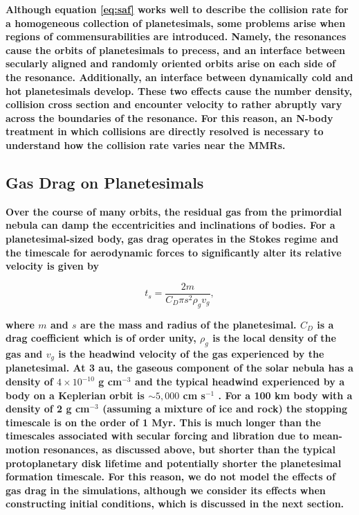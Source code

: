 \documentclass[fleqn,usenatbib]{mnras}
\begin{document}
\textbf{Although equation \ref{eq:saf} works well to describe the collision rate for a homogeneous collection of planetesimals, some problems arise when regions of commensurabilities are 
introduced. Namely, the resonances cause the orbits of planetesimals to precess, and an interface between secularly aligned and randomly oriented orbits arise on each side of the 
resonance. Additionally, an interface between dynamically cold and hot planetesimals develop. These two effects cause the number density, collision cross section and encounter velocity 
to rather abruptly vary across the boundaries of the resonance. For this reason, an N-body treatment in which collisions are directly resolved is necessary to understand how the collision 
rate varies near the MMRs.}

\subsection{Gas Drag on Planetesimals}\label{sec:pl_drag}

\textbf{Over the course of many orbits, the residual gas from the primordial nebula can damp the eccentricities and inclinations of bodies. For a planetesimal-sized body, gas drag operates 
in the Stokes regime and the timescale for aerodynamic forces to significantly alter its relative velocity is given by \citep{1976PThPh..56.1756A}}

\begin{equation}\label{eq:ts_stokes}
    t_{s} = \frac{2 m}{C_{D} \pi s^{2} \rho_{g} v_{g}},
\end{equation}

\noindent \textbf{where $m$ and $s$ are the mass and radius of the planetesimal. $C_{D}$ is a drag coefficient which is of order unity, $
\rho_{g}$ is the local density of the gas and $v_{g}$ is the headwind velocity of the gas experienced by the planetesimal. At 3 au, the gaseous component of the solar nebula has a
density of $4 \times 10^{-10}$ g cm$^{-3}$ and the typical headwind experienced by a body on a Keplerian orbit is $\sim 5,000$ cm s$^{-1}$ \citep{1981PThPS..70...35H}. For a 100 km 
body with a density of 2 g cm$^{-3}$ \textbf{(assuming a mixture of ice and rock)} the stopping timescale is on the order of 1 Myr. This is much longer than the timescales associated with 
secular forcing and libration due to mean-motion resonances, as discussed above, but shorter than the typical protoplanetary disk lifetime and potentially shorter the planetesimal 
formation timescale. For this reason, we do not model the effects of gas drag in the simulations, although we consider its effects when constructing initial conditions, which is discussed in 
the next section.}
\end{document}
